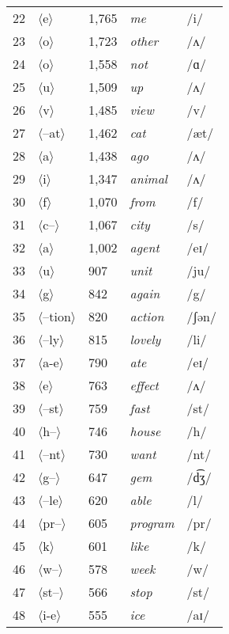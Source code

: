 \begin{longtable}{lllll}
22 & $\langle$e$\rangle$ & 1,765 & \textit{me} & /i/ \\
23 & $\langle$o$\rangle$ & 1,723 & \textit{other} & /ʌ/ \\
24 & $\langle$o$\rangle$ & 1,558 & \textit{not} & /ɑ/ \\
25 & $\langle$u$\rangle$ & 1,509 & \textit{up} & /ʌ/ \\
26 & $\langle$v$\rangle$ & 1,485 & \textit{view} & /v/ \\
27 & $\langle$--at$\rangle$ & 1,462 & \textit{cat} & /æt/ \\
28 & $\langle$a$\rangle$ & 1,438 & \textit{ago} & /ʌ/ \\
29 & $\langle$i$\rangle$ & 1,347 & \textit{animal} & /ʌ/ \\
30 & $\langle$f$\rangle$ & 1,070 & \textit{from} & /f/ \\
31 & $\langle$c--$\rangle$ & 1,067 & \textit{city} & /s/ \\
32 & $\langle$a$\rangle$ & 1,002 & \textit{agent} & /eɪ/ \\
33 & $\langle$u$\rangle$ & 907 & \textit{unit} & /ju/ \\
34 & $\langle$g$\rangle$ & 842 & \textit{again} & /g/ \\
35 & $\langle$--tion$\rangle$ & 820 & \textit{action} & /ʃən/ \\
36 & $\langle$--ly$\rangle$ & 815 & \textit{lovely} & /li/ \\
37 & $\langle$a-e$\rangle$ & 790 & \textit{ate} & /eɪ/ \\
38 & $\langle$e$\rangle$ & 763 & \textit{effect} & /ʌ/ \\
39 & $\langle$--st$\rangle$ & 759 & \textit{fast} & /st/ \\
40 & $\langle$h--$\rangle$ & 746 & \textit{house} & /h/ \\
41 & $\langle$--nt$\rangle$ & 730 & \textit{want} & /nt/ \\
42 & $\langle$g--$\rangle$ & 647 & \textit{gem} & /d͡ʒ/ \\
43 & $\langle$--le$\rangle$ & 620 & \textit{able} & /l/ \\
44 & $\langle$pr--$\rangle$ & 605 & \textit{program} & /pr/ \\
45 & $\langle$k$\rangle$ & 601 & \textit{like} & /k/ \\
46 & $\langle$w--$\rangle$ & 578 & \textit{week} & /w/ \\
47 & $\langle$st--$\rangle$ & 566 & \textit{stop} & /st/ \\
48 & $\langle$i-e$\rangle$ & 555 & \textit{ice} & /aɪ/ \\

\end{longtable}
